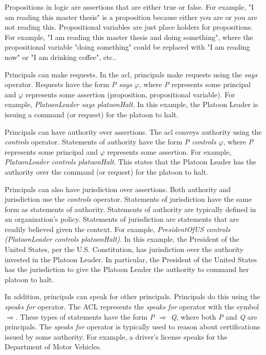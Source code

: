 \documentclass[../../main/main.tex]{subfiles}
\begin{document}
Propositions in logic are assertions that are either true or false.  For example, "I am reading this master thesis" is a proposition because either you are or you are not reading this.  Propositional variables are just place holders for propositions.  For example, "I am reading this master thesis and doing something", where the propositional variable "doing something" could be replaced with "I am reading now" or "I am drinking coffee", etc..

Principals can make requests.  In the \gls{acl}, principals make requests using the \textit{says} operator.  Requests have the form \textit{P says $\varphi$},  where \textit{P} represents some principal and \textit{$\varphi$} represents some assertion (proposition, propositional variable).  For example, \textit{PlatoonLeader says platoonHalt}.  In this example, the Platoon Leader is issuing a command (or request) for the platoon to halt.  

Principals can have authority over assertions.  The \gls{acl} conveys authority using the \textit{controls} operator.  Statements of authority have the form \textit{P controls $\varphi$},  where \textit{P} represents some principal and \textit{$\varphi$} represents some assertion.  For example, \textit{PlatoonLeader controls platoonHalt}.  This states that the Platoon Leader has the authority over the command (or request) for the platoon to halt. 

Principals can also have jurisdiction over assertions.  Both authority and jurisdiction use the \textit{controls} operator.  Statements of jurisdiction have the same form as statements of authority.  Statements of authority are typically defined in an organization's policy.  Statements of jurisdiction are statements that are readily believed given the context.  For example, \textit{PresidentOfUS controls (PlatoonLeader controls platoonHalt)}.  In this example, the President of the United States, per the U.S. Constitution, has jurisdiction over the authority invested in the Platoon Leader.  In particular, the President of the United States has the jurisdiction to give the Platoon Leader the authority to command her platoon to halt.

In addition, principals can speak for other principals.  Principals do this using the \textit{speaks for} operator.  The ACL represents the \textit{speaks for} operator with the symbol $\Rightarrow$.  These types of statements have the form \textit{P $\Rightarrow$ Q}, where both \textit{P} and \textit{Q} are principals.  The \textit{speaks for} operator is typically used to reason about certifications issued by some authority.  For example, a driver's license speaks for the Department of Motor Vehicles.  
\end{document}

